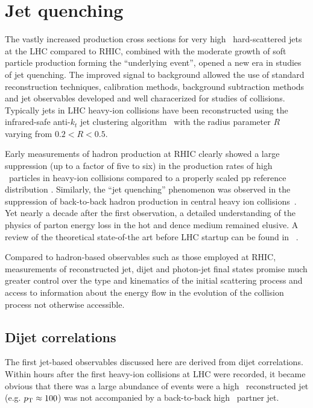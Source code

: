 \section{Jet quenching}
\label{jets_intro}

The vastly increased production cross sections for very high \pT\ hard-scattered jets at the LHC
compared to RHIC, combined with the moderate growth of soft particle production forming the ``underlying
event'', opened a new era in studies of jet quenching. The improved signal to background allowed the 
use of standard reconstruction techniques, calibration methods, background subtraction methods and 
jet observables developed and well characerized for studies of \pp collisions. 
Typically jets in LHC heavy-ion collisions have been reconstructed using 
the infrared-safe anti-$k_t$ jet clustering algorithm~\cite{Cacciari:2008gp} with the 
radius parameter $R$ varying from $0.2 < R  < 0.5$.

Early measurements of hadron production at RHIC
clearly showed a large suppression (up to a factor of five to six) in the production rates of 
high \pT\ particles in heavy-ion collisions compared to a properly scaled pp reference distribution
\cite{Adcox:2001jp,Adler:2002xw}. Similarly, the ``jet quenching'' phenomenon was observed 
in the suppression of back-to-back hadron production
in central heavy ion collisions~\cite{Adcox:2001jp,Adler:2002xw}. Yet nearly a decade after the first observation, a detailed 
understanding of the physics of parton energy loss in the hot and dence medium remained
elusive. A review of the theoretical state-of-the art before LHC startup can be 
found in ~\cite{Wiedemann:2009sh}.

Compared to hadron-based observables such as those employed at RHIC, measurements of reconstructed
jet, dijet and photon-jet final states promise much greater control over the type and kinematics
of the initial scattering process and access to information about the energy flow in the evolution
of the collision process not otherwise accessible. 

\subsection{Dijet correlations}

The first jet-based observables discussed here are derived from dijet correlations. Within hours
after the first heavy-ion collisions at LHC were recorded, it became obvious that there was
a large abundance of events were a high \pT\ reconstructed jet (e.g. $\mbox{$p_{\mathrm{T}}$} \approx 100$\GeVc) was
not accompanied by a back-to-back high \pT\ partner jet.

